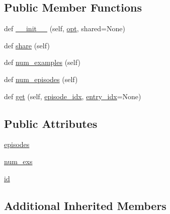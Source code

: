 \subsection*{Public Member Functions}
\begin{DoxyCompactItemize}
\item 
def \hyperlink{classparlai_1_1core_1_1teachers_1_1ParlAIDialogTeacher_ad79a47d28e60c24df72b8523aff6b247}{\+\_\+\+\_\+init\+\_\+\+\_\+} (self, \hyperlink{classparlai_1_1core_1_1agents_1_1Teacher_a3ce6243860ce978a897922863ed32fa4}{opt}, shared=None)
\item 
def \hyperlink{classparlai_1_1core_1_1teachers_1_1ParlAIDialogTeacher_a9e2eabf923a38b53865705786e07f461}{share} (self)
\item 
def \hyperlink{classparlai_1_1core_1_1teachers_1_1ParlAIDialogTeacher_a37c1c62c52860da9c63d9f6ed23ae6ae}{num\+\_\+examples} (self)
\item 
def \hyperlink{classparlai_1_1core_1_1teachers_1_1ParlAIDialogTeacher_aee1494d5dd0610530b4b93e56010e6f8}{num\+\_\+episodes} (self)
\item 
def \hyperlink{classparlai_1_1core_1_1teachers_1_1ParlAIDialogTeacher_a0ef5a3bbad31d95bc398a393ab0a310d}{get} (self, \hyperlink{classparlai_1_1core_1_1teachers_1_1FixedDialogTeacher_afd4ebab8063eb42d182d30a1a41f133e}{episode\+\_\+idx}, \hyperlink{classparlai_1_1core_1_1teachers_1_1FixedDialogTeacher_ae3201b15f3c3b46a2f3511bad9b43e7d}{entry\+\_\+idx}=None)
\end{DoxyCompactItemize}
\subsection*{Public Attributes}
\begin{DoxyCompactItemize}
\item 
\hyperlink{classparlai_1_1core_1_1teachers_1_1ParlAIDialogTeacher_a99d92211286cdcc382f723ebc9d272c4}{episodes}
\item 
\hyperlink{classparlai_1_1core_1_1teachers_1_1ParlAIDialogTeacher_accef414b3b1e708e7dd71a3e1871261f}{num\+\_\+exs}
\item 
\hyperlink{classparlai_1_1core_1_1teachers_1_1ParlAIDialogTeacher_a07870e07e8e6f708974ac9f51600e4fa}{id}
\end{DoxyCompactItemize}
\subsection*{Additional Inherited Members}


